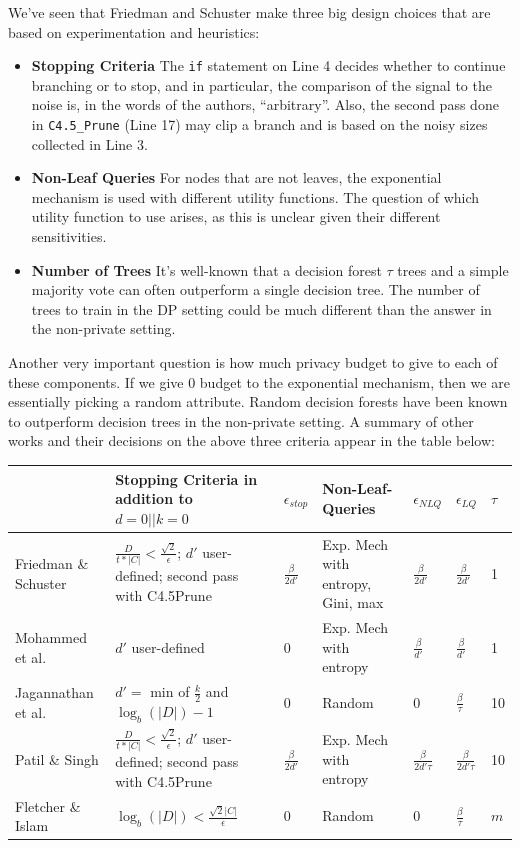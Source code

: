 \documentclass[11pt]{article}
\begin{document}
We've seen that Friedman and Schuster make three big design choices that are based on experimentation and heuristics:
\begin{itemize}
\item \textbf{Stopping Criteria} The \texttt{if} statement on Line 4 decides whether to continue branching or to stop, and in particular, the comparison of the signal to the noise is, in the words of the authors, ``arbitrary''. Also, the second pass done in \texttt{C4.5\_Prune} (Line 17) may clip a branch and is based on the noisy sizes collected in Line 3. 
\item \textbf{Non-Leaf Queries} For nodes that are not leaves, the exponential mechanism is used with different utility functions. The question of which utility function to use arises, as this is unclear given their different sensitivities.
\item \textbf{Number of Trees} It's well-known that a decision forest $\tau$ trees and a simple majority vote can often outperform a single decision tree. The number of trees to train in the DP setting could be much different than the answer in the non-private setting.
\end{itemize}
Another very important question is how much privacy budget to give to each of these components. If we give $0$ budget to the exponential mechanism, then we are essentially picking a random attribute. Random decision forests have been known to outperform decision trees in the non-private setting.
A summary of other works and their decisions on the above three criteria appear in the table below:
\begin{center}
\begin{tabular}{|p{2cm}|p{3cm}|l|p{3cm}|l|l|l|}
\hline
\; & Stopping Criteria in addition to $d = 0 || k=0$& $\epsilon_{stop}$ & Non-Leaf-Queries & $\epsilon_{NLQ}$ & $\epsilon_{LQ}$ & $\tau$ \\ \hline
Friedman \& Schuster \cite{Friedman:2010} & $\frac{D}{t*|C|} < \frac{\sqrt{2}}{\epsilon}$; $d'$ user-defined; second pass with C4.5Prune & $\frac{\beta}{2d'}$ & Exp. Mech with entropy, Gini, max & $\frac{\beta}{2d'}$ & $\frac{\beta}{2d'}$ & 1 \\ \hline
Mohammed et al. \cite{Mohammed:2015} & $d'$ user-defined & 0 & Exp. Mech with entropy & $\frac{\beta}{d'}$ & $\frac{\beta}{d'}$ & 1 \\ \hline
Jagannathan et al. \cite{Jagannathan:2009} & $d'=$ min of $\frac{k}{2}$ and $\log_b(|D|)-1$ & 0 & Random & 0 & $\frac{\beta}{\tau}$ & 10 \\ \hline
Patil \& Singh \cite{Singh:2014} & $\frac{D}{t*|C|} < \frac{\sqrt{2}}{\epsilon}$; $d'$ user-defined; second pass with C4.5Prune & $\frac{\beta}{2d'}$ & Exp. Mech with entropy & $\frac{\beta}{2d'\tau}$ & $\frac{\beta}{2d'\tau}$ & 10 \\ \hline
Fletcher \& Islam \cite{Fletcher:2015} & $\log_b(|D|) < \frac{\sqrt{2}|C|}{\epsilon}$ & 0 & Random & 0 & $\frac{\beta}{\tau}$ & $m$ \\ \hline
\end{tabular}
\end{center}
\end{document}
